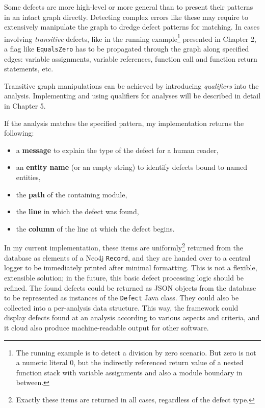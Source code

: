 Some defects are more high-level or more general than to present their patterns in an intact graph directly. Detecting complex errors like these may require to extensively manipulate the graph to dredge defect patterns for matching. In cases involving \emph{transitive} defects, like in the running example\footnote{The running example is to detect a division by zero scenario. But zero is not a numeric literal $0$, but the indirectly referenced return value of a nested function stack with variable assignments and also a module boundary in between.} presented in Chapter 2, a flag like \texttt{EqualsZero} has to be propagated through the graph along specified edges: variable assignments, variable references, function call and function return statements, etc.

Transitive graph manipulations can be achieved by introducing \emph{qualifiers} into the analysis. Implementing and using qualifiers for analyses will be described in detail in Chapter 5.

If the analysis matches the specified pattern, my implementation returns the following:

\begin{itemize}
\item a \textbf{message} to explain the type of the defect for a human reader,
\item an \textbf{entity name} (or an empty string) to identify defects bound to named entities,
\item the \textbf{path} of the containing module,
\item the \textbf{line} in which the defect was found,
\item the \textbf{column} of the line at which the defect begins.
\end{itemize}

In my current implementation, these items are uniformly\footnote{Exactly these items are returned in all cases, regardless of the defect type.} returned from the database as elements of a Neo4j \texttt{Record}, and they are handed over to a central logger to be immediately printed after minimal formatting. This is not a flexible, extensible solution; in the future, this basic defect processing logic should be refined. The found defects could be returned as JSON objects from the database to be represented as instances of the \texttt{Defect} Java class. They could also be collected into a per-analysis data structure. This way, the framework could display defects found at an analysis according to various aspects and criteria, and it cloud also produce machine-readable output for other software.


